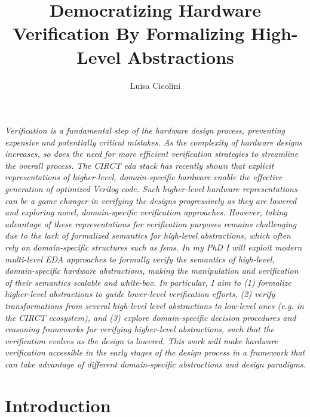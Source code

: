 \documentclass[sigconf,authorversion,nonacm, 11pt]{acmart}
\begin{document}
\title{Democratizing Hardware Verification By Formalizing High-Level Abstractions}

\author{Luisa Cicolini}

\maketitle
\thispagestyle{empty}


\textit{
    Verification is a fundamental step of the hardware design process, preventing expensive and potentially critical mistakes.
    As the complexity of hardware designs increases, so does the need for more efficient verification strategies to streamline the overall process.
    The CIRCT \ac{eda} stack has recently shown that explicit representations of higher-level, domain-specific hardware enable the effective generation of optimized Verilog code.
    Such higher-level hardware representations can be a game changer in verifying the designs progressively as they are lowered and exploring novel, domain-specific verification approaches. 
    However, taking advantage of these representations for verification purposes remains challenging due to the lack of formalized semantics for high-level abstractions, which often rely on domain-specific structures such as \acp{fsm}.
    In my PhD I will exploit modern multi-level EDA approaches to formally verify the semantics of high-level, domain-specific hardware abstractions, making the manipulation and verification of their semantics scalable and white-box.
    In particular, I aim to
    (1) formalize higher-level abstractions to guide lower-level verification efforts, 
    (2) verify transformations from several high-level level abstractions to low-level ones (e.g. in the CIRCT ecosystem), and
    (3) explore domain-specific decision procedures and reasoning frameworks for verifying higher-level abstractions, such that the verification evolves as the design is lowered. 
    This work will make hardware verification accessible in the early stages of the design process in a framework that can take advantage of different domain-specific abstractions and design paradigms.
}   


\section{Introduction}
\end{document}
